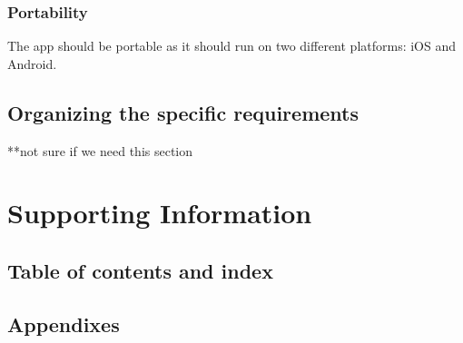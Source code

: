 \documentclass[letterpaper,10pt,draftclsnofoot,onecolumn,titlepage]{IEEEtran}
\begin{document}
	\subsubsection{Portability} The app should be portable as it should run on two different platforms: iOS and Android.

	\subsection{Organizing the specific requirements}
	**not sure if we need this section

	\section{Supporting Information}
	\subsection{Table of contents and index}
	\subsection{Appendixes}
\end{document}
